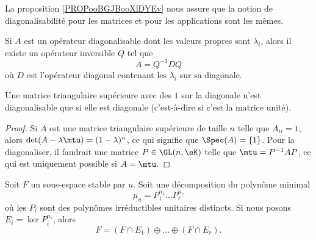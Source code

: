 La proposition \ref{PROPooBGJBooXlDYEv} nous assure que la notion de diagonalisabilité pour les matrices et pour les applications sont les mêmes.

\begin{proposition}     \label{PROPooDEETooSOMiGO}
    Si \( A\) est un opérateur diagonalisable dont les valeurs propres sont \( \lambda_i\), alors il existe un opérateur inversible \( Q\) tel que
    \begin{equation}
        A=Q^{-1} DQ
    \end{equation}
    où \( D \) est l'opérateur diagonal contenant les \( \lambda_i\) sur sa diagonale.
\end{proposition}

\begin{lemma}
    Une matrice triangulaire supérieure avec des \( 1\) sur la diagonale n'est diagonalisable que si elle est diagonale (c'est-à-dire si c'est la matrice unité).
\end{lemma}

\begin{proof}
    Si \( A\) est une matrice triangulaire supérieure de taille \( n\) telle que \( A_{ii}=1\), alors \( \det(A-\lambda\mtu)=(1-\lambda)^n\), ce qui signifie que \( \Spec(A)=\{ 1 \}\). Pour la diagonaliser, il faudrait une matrice \( P\in\GL(n,\eK)\) telle que \( \mtu=P^{-1}AP\), ce qui est uniquement possible si \( A=\mtu\).
\end{proof}

\begin{lemma}       \label{LemgnaEOk}
    Soit \( F\) un sous-espace stable par \( u\). Soit une décomposition du polynôme minimal
    \begin{equation}
        \mu_u=P_1^{n_1}\ldots P_r^{n_r}
    \end{equation}
    où les \( P_i\) sont des polynômes irréductibles unitaires distincts. Si nous posons \( E_i=\ker P_i^{n_i}\), alors
    \begin{equation}
        F=(F\cap E_1)\oplus\ldots \oplus(F\cap E_r).
    \end{equation}
\end{lemma}

